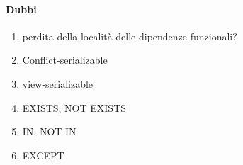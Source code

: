 \documentclass{exam}
\begin{document}
\paragraph{Dubbi}
\begin{enumerate}
    \item perdita della località delle dipendenze funzionali?
    \item Conflict-serializable
    \item view-serializable
    \item EXISTS, NOT EXISTS
    \item IN, NOT IN
    \item EXCEPT
\end{enumerate}
\end{document}
